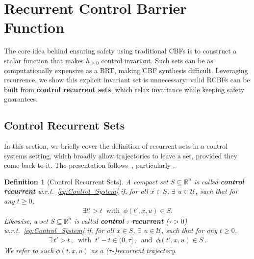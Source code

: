 \documentclass[letterpaper, 10 pt, conference]{ieeeconf}
\newtheorem{definition}{Definition}
\begin{document}
\section{Recurrent Control Barrier Function}
\label{sec:problemformulation}

The core idea behind ensuring safety using traditional CBFs is to construct a scalar function that makes $h_{\geq0}$ control invariant. Such sets can be as computationally expensive as a BRT, making CBF synthesis difficult. Leveraging recurrence, we show this explicit invariant set is unnecessary: valid RCBFs can be built from \textbf{control recurrent sets}, which relax invariance while keeping safety guarantees.

\subsection{Control Recurrent Sets}

In this section, we briefly cover the definition of recurrent sets in a control systems setting, which broadly allow trajectories to leave a set, provided they come back to it. The presentation follows~\cite{sbm2022cdc,ssm2024allerton,sm2024hscc}, particularly \cite{sm2024hscc}.

\begin{definition}[Control Recurrent Sets]
\label{def:recurrence}
A compact set $S \subseteq \mathbb{R}^n$ is called \textbf{control recurrent} w.r.t.~\eqref{eq:Control_System} if, for all $ x \in S $, $\exists$ $u\in \mathcal{U}$, such that for any $ t \geq 0 $,
\begin{align}
\exists t' > t \;\; \mathrm{with} \;\; \phi(t', x, u) \in S.
\end{align}
Likewise, a set $ S \subseteq \mathbb{R}^n $ is called \textbf{control} $\tau$-\textbf{recurrent} ($\tau > 0$) w.r.t.~\eqref{eq:Control_System} if, for all $ x \in S $,  $\exists$ $u\in \mathcal{U}$, such that for any $t \ge 0$,
\begin{align}\label{eq:tau-recurrent}
\exists\, t' > t\,, \;\; \mathrm{with} \;\; t' - t \in (0, \tau]\,, \;\; \mathrm{and} \;\; \phi(t', x, u) \in S\,.
\end{align}
We refer to such $\phi(t,x,u)$ as a ($\tau$-)recurrent trajectory.
\end{definition}
\end{document}
